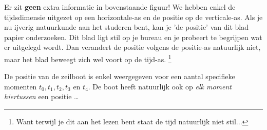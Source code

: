 \documentclass{ximera}
\begin{document}
	
	

Er zit \textbf{geen} extra informatie in bovenstaande figuur! 
We hebben enkel de tijdsdimensie uitgezet op een horizontale-as en de positie op de verticale-as. 
Als je nu ijverig natuurkunde aan het studeren bent, kan je 'de positie' van dit blad papier onderzoeken. 
Dit blad ligt stil op je bureau en je probeert te begrijpen wat er uitgelegd wordt. 
Dan verandert de positie volgens de positie-as natuurlijk niet, maar het blad beweegt zich wel voort op de tijd-as. \footnote{Want terwijl je dit aan het lezen bent staat de tijd natuurlijk niet stil...\footnotemark}



De positie van de zeilboot is enkel weergegeven voor een aantal specifieke momenten \(t_0, t_1, t_2, t_3 \text{ en } t_4\). 
De boot heeft natuurlijk ook op \textit{elk moment hiertussen} een positie \ldots
\end{document}
